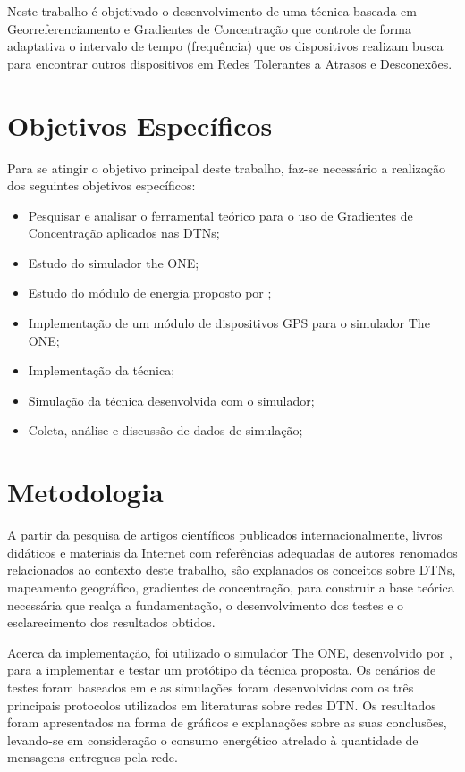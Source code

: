 Neste trabalho é objetivado o desenvolvimento de uma técnica baseada em Georreferenciamento e Gradientes de Concentração que controle de forma adaptativa o intervalo de tempo (frequência) que os dispositivos realizam busca para encontrar outros dispositivos em Redes Tolerantes a Atrasos e Desconexões.

\section{Objetivos Específicos}\label{sec:objetivos_especificos}

Para se atingir o objetivo principal deste trabalho, faz-se necessário a realização dos seguintes objetivos específicos:

\begin{itemize}
 \item Pesquisar e analisar o ferramental teórico para o uso de Gradientes de Concentração aplicados nas DTNs;
 \item Estudo do simulador the ONE;
 \item Estudo do módulo de energia proposto por \cite{denis_artigo};
 \item Implementação de um módulo de dispositivos GPS para o simulador The ONE;
 \item Implementação da técnica;
 \item Simulação da técnica desenvolvida com o simulador;
 \item Coleta, análise e discussão de dados de simulação;
\end{itemize}

\section{Metodologia}\label{sec:metodologia}

A partir da pesquisa de artigos científicos publicados internacionalmente, livros didáticos e materiais da Internet com referências adequadas de autores renomados relacionados ao contexto deste trabalho, são explanados os conceitos sobre DTNs, mapeamento geográfico, gradientes de concentração, para construir a base teórica necessária que realça a fundamentação, o desenvolvimento dos testes e o esclarecimento dos resultados obtidos.

Acerca da implementação, foi utilizado o simulador The ONE, desenvolvido por \cite{keranen2009one}, para a implementar e testar um protótipo da técnica proposta. Os cenários de testes foram baseados em \cite{denis_artigo} e as simulações foram desenvolvidas com os três principais protocolos utilizados em literaturas sobre redes DTN. Os resultados foram apresentados na forma de gráficos e explanações sobre as suas conclusões, levando-se em consideração o consumo energético atrelado à quantidade de mensagens entregues pela rede.
